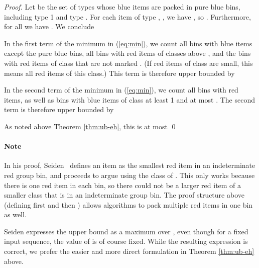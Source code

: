 \begin{proof}
	Let  be the set of types whose blue items are packed in pure blue bins, including type 1 and type . 
	For each item  of type , , we have , 
	so . Furthermore, for all  we have .
	We conclude
	
	
	In the first term of the minimum in (\ref{eq:min}), we count all bins with blue items
	except the pure blue bins, all bins with red items of classes
	above , and the bins with red items of class  that are not marked .
	(If red items of class  are small, this means all red items of this class.)
This term is therefore upper bounded by 
	
In the second term of the minimum in (\ref{eq:min}), we count all bins with red items, as well
	as bins with blue items of class at least 1 and at most .
The second term is therefore  upper bounded by  
	
	As noted above Theorem \ref{thm:ub-eh}, this is at most 
	\qed\end{proof}

\paragraph{Note} In his proof, Seiden~\cite{Seiden02} defines an item  as the smallest red item in an indeterminate red group bin, and proceeds to argue using the class of . This only works because there is one red item in each bin, so there could not be a larger red item of a smaller class that is in an indeterminate group bin. The proof structure above (defining first  and then ) allows {\SuperH} algorithms to pack multiple red items in one bin as well.

Seiden expresses the upper bound as a maximum over , even though for 
a fixed input sequence, the value of  is of course fixed. 
While the resulting expression is correct, we prefer the easier and more direct formulation in Theorem \ref{thm:ub-eh} above.
\iffalse However, this may have been introduced 
to properly cover the case : the inequalities proved for  do not hold if ,
as can be seen for an output consisting mostly of blue items (the first inequality requires that
there are more bins with red items than with blue items in this case, which does not have to hold)
\fi 













